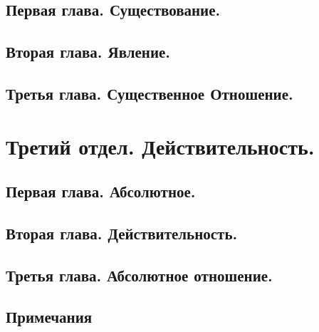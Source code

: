 \documentclass[b5paper, 11pt, twoside, onecolumn, openany]{memoir}
\begin{document}
\chapter*{Первая глава. Существование.}


\chapter*{Вторая глава. Явление.}


\chapter*{Третья глава. Существенное Отношение.}


\part*{Третий отдел. Действительность.}
\chapter*{Первая глава. Абсолютное.}


\chapter*{Вторая глава. Действительность.}


\chapter*{Третья глава. Абсолютное отношение.}


\backmatter

\chapter*{Примечания}



\clearpage
\tableofcontents*
\clearpage
\end{document}
